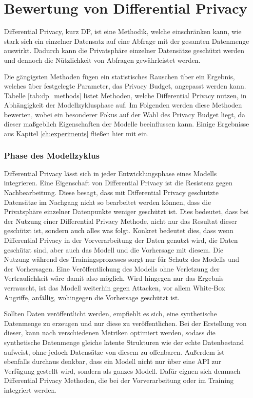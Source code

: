 \section{Bewertung von Differential Privacy}\label{sec:bw_dp}

Differential Privacy, kurz DP, ist eine Methodik, welche einschränken kann, wie stark sich ein einzelner Datensatz auf eine Abfrage mit der gesamten Datenmenge auswirkt.
Dadurch kann die Privatsphäre einzelner Datensätze geschützt werden und dennoch die Nützlichkeit von Abfragen gewährleistet werden.



Die gängigsten Methoden fügen ein statistisches Rauschen über ein Ergebnis, welches über festgelegte Parameter, das Privacy Budget, angepasst werden kann.
Tabelle \ref{tab:dp_methods} listet Methoden, welche Differential Privacy nutzen, in Abhängigkeit der Modellzyklusphase auf.
Im Folgenden werden diese Methoden bewerten, wobei ein besonderer Fokus auf der Wahl des Privacy Budget liegt, da dieser maßgeblich Eigenschaften der Modelle beeinflussen kann.
Einige Ergebnisse aus Kapitel \ref{ch:experiments} fließen hier mit ein.


\subsubsection*{Phase des Modellzyklus}
Differential Privacy lässt sich in jeder Entwicklungsphase eines Modells integrieren.
Eine Eigenschaft von Differential Privacy ist die Resistenz gegen Nachbearbeitung.
Diese besagt, dass mit Differential Privacy geschützte Datensätze im Nachgang nicht so bearbeitet werden können, dass die Privatsphäre einzelner Datenpunkte weniger geschützt ist.
Dies bedeutet, dass bei der Nutzung einer Differential Privacy Methode, nicht nur das Resultat dieser geschützt ist, sondern auch alles was folgt.
Konkret bedeutet dies, dass wenn Differential Privacy in der Vorverarbeitung der Daten genutzt wird, die Daten geschützt sind, aber auch das Modell und die Vorhersage mit diesem.
Die Nutzung während des Trainingsprozesses sorgt nur für Schutz des Modells und der Vorhersagen. 
Eine Veröffentlichung des Modells ohne Verletzung der Vertraulichkeit wäre damit also möglich.
Wird hingegen nur das Ergebnis verrauscht, ist das Modell weiterhin gegen Attacken, vor allem White-Box Angriffe, anfällig, wohingegen die Vorhersage geschützt ist.

Sollten Daten veröffentlicht werden, empfiehlt es sich, eine synthetische Datenmenge zu erzeugen und nur diese zu veröffentlichen.
Bei der Erstellung von dieser, kann nach verschiedenen Metriken optimiert werden, sodass die synthetische Datenmenge gleiche latente Strukturen wie der echte Datenbestand aufweist, ohne jedoch Datensätze von diesem zu offenbaren.
Außerdem ist ebenfalls durchaus denkbar, dass ein Modell nicht nur über eine API zur Verfügung gestellt wird, sondern als ganzes Modell. 
Dafür eignen sich demnach Differential Privacy Methoden, die bei der Vorverarbeitung oder im Training integriert werden.

